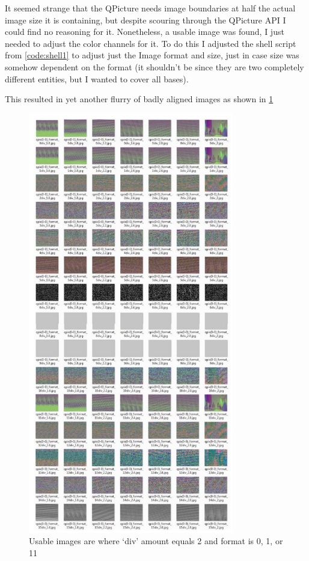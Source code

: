 \documentclass[11pt]{article} %
\begin{document}
It seemed strange that the QPicture needs image boundaries at half the actual image size it is containing, but despite scouring through the QPicture API I could find no reasoning for it. Nonetheless, a usable image was found, I just needed to adjust the color channels for it.
To do this I adjusted the shell script from \cref{code:shell1} to adjust just the Image format and size, just in case size was somehow dependent on the format (it shouldn’t be since they are two completely different entities, but I wanted to cover all bases).
\pagebreak
\begin{frame}[fragile]
	
\end{frame}
This resulted in yet another flurry of badly aligned images as shown in \cref{fig:shell2}
\begin{figure}
	\begin{center}
		\includegraphics[width=0.8\textwidth]{../images/qpix/shell2}
	\end{center}
	\vspace{-20pt}
	\caption{Usable images are where ‘div’ amount equals 2 and format is 0, 1, or 11}
	\label{fig:shell2}
\end{figure}
\end{document}
